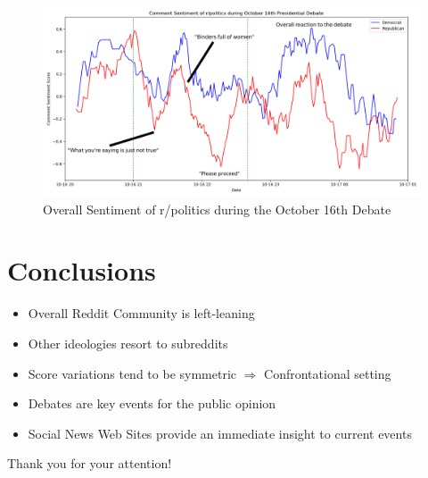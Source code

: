 \documentclass[aspectratio=169,notes]{beamer}
\begin{document}
\begin{frame}
 \begin{figure}[htp]
 \centering
 \includegraphics[width=\linewidth]{comment_sentiment_debate.png}
 \caption{Overall Sentiment of r/politics during the October 16th Debate}
\end{figure}
\end{frame}

\section{Conclusions}

\begin{frame}
 \begin{itemize}
  \item Overall Reddit Community is \alert{left-leaning}\pause
  \item Other ideologies resort to subreddits\pause
  \item Score variations tend to be symmetric \(\Rightarrow\) \alert{Confrontational} setting\pause
  \item \alert{Debates} are key events for the public opinion\pause
  \item Social News Web Sites provide an \alert{immediate insight} to current events\pause
 \end{itemize}

\end{frame}

\begin{frame}
\centering
\Huge
Thank you for your attention!
\end{frame}

\begin{frame}[allowframebreaks]
 \nocite{*}
 \printbibliography
\end{frame}
\end{document}
